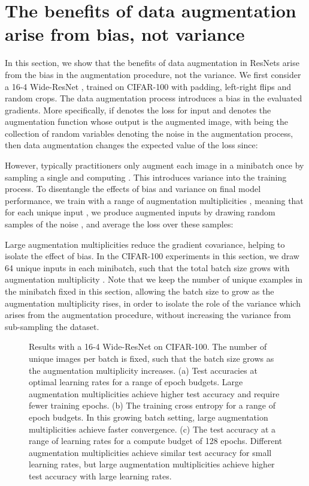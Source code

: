 \documentclass{article}
\begin{document}
\section{The benefits of data augmentation arise from bias, not variance}
\label{sec:growing_batch}
In this section, we show that the benefits of data augmentation in ResNets arise from the bias in the augmentation procedure, not the variance. We first consider a 16-4 Wide-ResNet \citep{zagoruyko2016wide}, trained on CIFAR-100 \citep{krizhevsky2009learning} with padding, left-right flips and random crops. The data augmentation process introduces a bias in the evaluated gradients. More specifically, if  denotes the loss for input  and  denotes the augmentation function whose output is the augmented image, with  being the collection of random variables denoting the noise in the augmentation process, then data augmentation changes the expected value of the loss since:

However, typically practitioners only augment each image in a minibatch once by sampling a single  and computing . This introduces variance into the training process. To disentangle the effects of bias and variance on final model performance, we train with a range of augmentation multiplicities , meaning that for each unique input , we produce  augmented inputs by drawing  random samples of the noise , and average the loss over these  samples:

Large augmentation multiplicities reduce the gradient covariance, helping to isolate the effect of bias. In the CIFAR-100 experiments in this section, we draw 64 unique inputs in each minibatch, such that the total batch size  grows with augmentation multiplicity . Note that we keep the number of unique examples in the minibatch fixed in this section, allowing the batch size to grow as the augmentation multiplicity rises, in order to isolate the role of the variance which arises from the augmentation procedure, without increasing the variance from sub-sampling the dataset.
\begin{figure}[t]
\centering
  \vskip -3mm
  \vskip -2.5mm
\caption{Results with a 16-4 Wide-ResNet on CIFAR-100. The number of unique images per batch is fixed, such that the batch size grows as the augmentation multiplicity  increases. (a) Test accuracies at optimal learning rates for a range of epoch budgets. Large augmentation multiplicities achieve higher test accuracy and require fewer training epochs. (b) The training cross entropy for a range of epoch budgets.
In this growing batch setting, large augmentation multiplicities achieve faster convergence. (c) The test accuracy at a range of learning rates for a compute budget of 128 epochs. Different augmentation multiplicities achieve similar test accuracy for small learning rates, but large augmentation multiplicities achieve higher test accuracy with large learning rates.
}
  \vskip -2.5mm
\label{fig:growing_cifar}
\end{figure}
\end{document}
